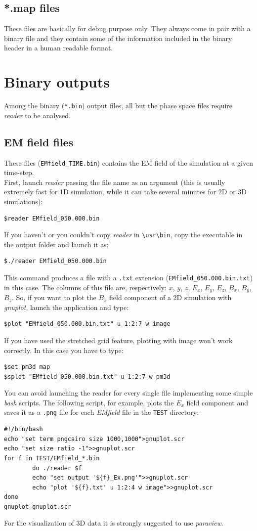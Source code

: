 \documentclass[11pt,a4paper]{report}
\begin{document}
\subsection{*.map files}
These files are basically for debug purpose only. They always come in pair with a binary file and they contain some of the information included in the binary header in a human readable format.

\section{Binary outputs}
Among the binary (\verb+*.bin+) output files, all but the phase space files require \emph{reader} to be analysed. 
\subsection{EM field files}
These files (\verb+EMfield_TIME.bin+) contains the EM field of the simulation at a given time-step.\\
First, launch \emph{reader} passing the file name as an argument (this is usually extremely fast for 1D simulation, while it can take several minutes for 2D or 3D simulations):
\begin{verbatim}
$reader EMfield_050.000.bin
\end{verbatim}
If you haven't or you couldn't copy \emph{reader} in \verb+\usr\bin+, copy the executable in the output folder and launch it as:
\begin{verbatim}
$./reader EMfield_050.000.bin
\end{verbatim}
This command produces a file with a \verb+.txt+ extension (\verb+EMfield_050.000.bin.txt+) in this case. The columns of this file are, respectively: $x$, $y$, $z$, $E_x$, $E_y$, $E_z$, $B_x$, $B_y$, $B_z$. So, if you want to plot the $B_x$ field component of a 2D simulation with \emph{gnuplot}, launch the application and type:
\begin{verbatim}
$plot "EMfield_050.000.bin.txt" u 1:2:7 w image
\end{verbatim}
If you have used the stretched grid feature, plotting with image won't work correctly. In this case you have to type:
\begin{verbatim}
$set pm3d map
$splot "EMfield_050.000.bin.txt" u 1:2:7 w pm3d
\end{verbatim}
You can avoid launching the reader for every single file implementing some simple \emph{bash} scripts. The following script, for example, plots the 
$E_x$ field component and saves it as a \verb+.png+ file for each \emph{EMfield} file in the \verb+TEST+ directory:
\begin{verbatim}
#!/bin/bash
echo "set term pngcairo size 1000,1000">gnuplot.scr
echo "set size ratio -1">>gnuplot.scr
for f in TEST/EMfield_*.bin
        do ./reader $f
        echo "set output '${f}_Ex.png'">>gnuplot.scr
        echo "plot '${f}.txt' u 1:2:4 w image">>gnuplot.scr 
done
gnuplot gnuplot.scr
\end{verbatim}
For the visualization of 3D data it is strongly suggested to use \emph{paraview}.
\end{document}
